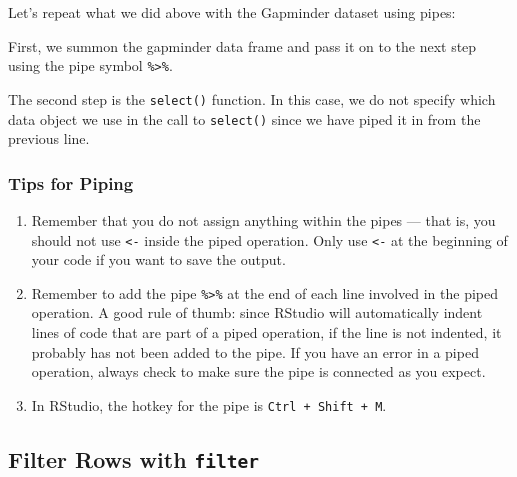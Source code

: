 \documentclass[
]{book}
\newenvironment{Shaded}{\begin{snugshade}}{\end{snugshade}}
\newcommand{\KeywordTok}[1]{\textcolor[rgb]{0.13,0.29,0.53}{\textbf{#1}}}
\newcommand{\NormalTok}[1]{#1}
\newcommand{\OperatorTok}[1]{\textcolor[rgb]{0.81,0.36,0.00}{\textbf{#1}}}
\newcommand{\StringTok}[1]{\textcolor[rgb]{0.31,0.60,0.02}{#1}}
\begin{document}
Let's repeat what we did above with the Gapminder dataset using pipes:

\begin{Shaded}
\end{Shaded}

First, we summon the gapminder data frame and pass it on to the next step using the pipe symbol \texttt{\%\textgreater{}\%}.

The second step is the \texttt{select()} function. In this case, we do not specify which data object we use in the call to \texttt{select()} since we have piped it in from the previous line.

\hypertarget{tips-for-piping}{%
\subsubsection*{Tips for Piping}\label{tips-for-piping}}

\begin{enumerate}
\def\labelenumi{\arabic{enumi}.}
\item
  Remember that you do not assign anything within the pipes --- that is, you should not use \texttt{\textless{}-} inside the piped operation. Only use \texttt{\textless{}-} at the beginning of your code if you want to save the output.
\item
  Remember to add the pipe \texttt{\%\textgreater{}\%} at the end of each line involved in the piped operation. A good rule of thumb: since RStudio will automatically indent lines of code that are part of a piped operation, if the line is not indented, it probably has not been added to the pipe. If you have an error in a piped operation, always check to make sure the pipe is connected as you expect.
\item
  In RStudio, the hotkey for the pipe is \texttt{Ctrl\ +\ Shift\ +\ M}.
\end{enumerate}

\hypertarget{filter-rows-with-filter}{%
\subsection{\texorpdfstring{Filter Rows with \texttt{filter}}{Filter Rows with filter}}\label{filter-rows-with-filter}}
\end{document}
